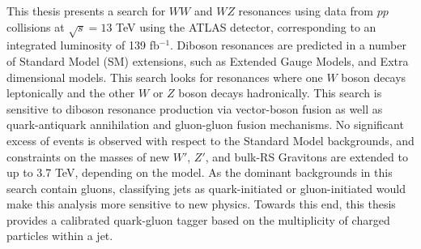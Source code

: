 This thesis presents a search for $WW$ and $WZ$ resonances using data from $pp$ collisions at $\sqrt{s}=13$ TeV using the ATLAS detector, corresponding to an integrated luminosity of 139 fb$^{-1}$. Diboson resonances are predicted in a number of Standard Model (SM) extensions, such as Extended Gauge Models, and Extra dimensional models. This search looks for resonances where one $W$ boson decays leptonically and the other $W$ or $Z$ boson decays hadronically. This search is sensitive to diboson resonance production via vector-boson fusion as well as quark-antiquark annihilation and gluon-gluon fusion mechanisms. No significant excess of events is observed with respect to the Standard Model backgrounds, and constraints on the masses of new $W'$, $Z'$, and bulk-RS Gravitons are extended to up to 3.7 TeV, depending on the model. As the dominant backgrounds in this search contain gluons, classifying jets as quark-initiated or gluon-initiated would make this analysis more sensitive to new physics. Towards this end, this thesis provides a calibrated quark-gluon tagger based on the multiplicity of charged particles within a jet.